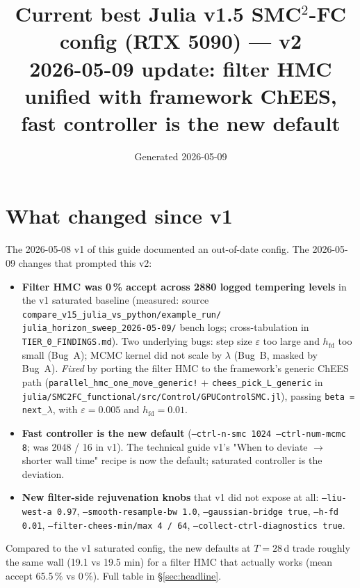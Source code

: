 \documentclass[11pt,a4paper]{article}
\title{\textbf{Current best Julia v1.5 SMC$^2$-FC config (RTX 5090) --- v2}\\
       \large 2026-05-09 update: filter HMC unified with framework ChEES,
              fast controller is the new default}
\author{}
\date{Generated 2026-05-09}
\begin{document}
\maketitle

\section*{What changed since v1}

The 2026-05-08 v1 of this guide documented an out-of-date config. The
2026-05-09 changes that prompted this v2:

\begin{itemize}[leftmargin=*, itemsep=2pt]
\item \textbf{Filter HMC was 0\,\% accept across 2880 logged tempering
      levels} in the v1 saturated baseline (measured: source
      \texttt{compare\_v15\_julia\_vs\_python/example\_run/}\\
      \texttt{julia\_horizon\_sweep\_2026-05-09/} bench logs;
      cross-tabulation in
      \texttt{TIER\_0\_FINDINGS.md}). Two underlying bugs:
      step size $\varepsilon$ too large and $h_{\mathrm{fd}}$ too
      small (Bug~A); MCMC kernel did not scale by $\lambda$ (Bug~B,
      masked by Bug~A). \emph{Fixed} by porting the filter HMC to
      the framework's generic ChEES path
      (\texttt{parallel\_hmc\_one\_move\_generic!} +
      \texttt{chees\_pick\_L\_generic} in
      \texttt{julia/SMC2FC\_functional/src/Control/GPUControlSMC.jl}),
      passing \texttt{beta = next\_$\lambda$}, with
      $\varepsilon = 0.005$ and $h_{\mathrm{fd}} = 0.01$.
\item \textbf{Fast controller is the new default}
      (\texttt{--ctrl-n-smc 1024 --ctrl-num-mcmc 8}; was 2048 / 16
      in v1). The technical guide v1's "When to deviate $\to$
      shorter wall time" recipe is now the default; saturated
      controller is the deviation.
\item \textbf{New filter-side rejuvenation knobs} that v1 did not
      expose at all: \texttt{--liu-west-a 0.97},
      \texttt{--smooth-resample-bw 1.0},
      \texttt{--gaussian-bridge true},
      \texttt{--h-fd 0.01},
      \texttt{--filter-chees-min/max 4 / 64},
      \texttt{--collect-ctrl-diagnostics true}.
\end{itemize}

Compared to the v1 saturated config, the new defaults at
$T = 28$\,d trade roughly the same wall (19.1 vs 19.5 min) for a
filter HMC that actually works (mean accept 65.5\,\% vs 0\,\%). Full
table in \S\ref{sec:headline}.
\end{document}
